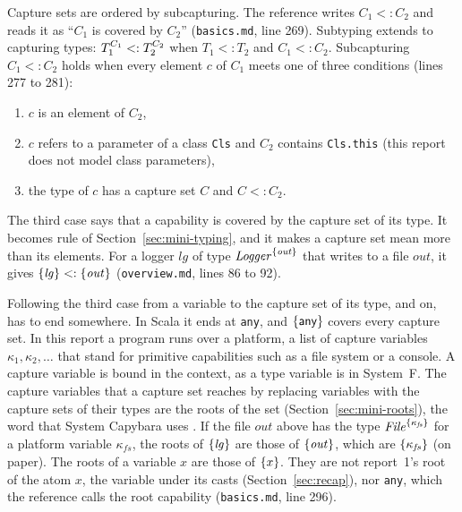 Capture sets are ordered by subcapturing. The reference writes $C_1 \mathrel{<:} C_2$ and reads it as ``$C_1$ is covered by $C_2$'' (\texttt{basics.md}, line 269). Subtyping extends to capturing types: $T_1^{C_1} \mathrel{<:} T_2^{C_2}$ when $T_1 \mathrel{<:} T_2$ and $C_1 \mathrel{<:} C_2$. Subcapturing $C_1 \mathrel{<:} C_2$ holds when every element $c$ of $C_1$ meets one of three conditions (lines 277 to 281):
\begin{enumerate}
\item $c$ is an element of $C_2$,
\item $c$ refers to a parameter of a class \lstinline|Cls| and $C_2$ contains \lstinline|Cls.this| (this report does not model class parameters),
\item the type of $c$ has a capture set $C$ and $C \mathrel{<:} C_2$.
\end{enumerate}
The third case says that a capability is covered by the capture set of its type. It becomes rule  of Section~\ref{sec:mini-typing}, and it makes a capture set mean more than its elements. For a logger $\mathit{lg}$ of type $\mathit{Logger}^{\{\mathit{out}\}}$ that writes to a file $\mathit{out}$, it gives $\{\mathit{lg}\} \mathrel{<:} \{\mathit{out}\}$ (\texttt{overview.md}, lines 86 to 92).

Following the third case from a variable to the capture set of its type, and on, has to end somewhere. In Scala it ends at \lstinline|any|, and $\{\mathsf{any}\}$ covers every capture set. In this report a program runs over a platform, a list of capture variables $\kappa_1, \kappa_2, \ldots$ that stand for primitive capabilities such as a file system or a console. A capture variable is bound in the context, as a type variable is in System~F. The capture variables that a capture set reaches by replacing variables with the capture sets of their types are the roots of the set (Section~\ref{sec:mini-roots}), the word that System Capybara uses \cite{xu2026capybara}. If the file $\mathit{out}$ above has the type $\mathit{File}^{\{\kappa_{\mathit{fs}}\}}$ for a platform variable $\kappa_{\mathit{fs}}$, the roots of $\{\mathit{lg}\}$ are those of $\{\mathit{out}\}$, which are $\{\kappa_{\mathit{fs}}\}$ (on paper). The roots of a variable $x$ are those of $\{x\}$. They are not report~1's root of the atom $x$, the variable under its casts (Section~\ref{sec:recap}), nor \lstinline|any|, which the reference calls the root capability (\texttt{basics.md}, line 296).

